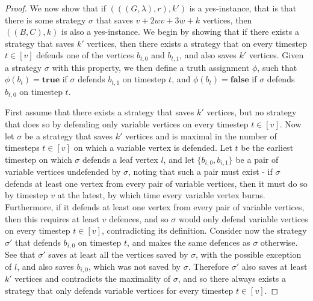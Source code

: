 \documentclass[a4paper,UKenglish,cleveref, autoref, thm-restate]{lipics-v2021} %
\begin{document}
\begin{toappendix}
\begin{proof}
We now show that if $(((G, \lambda), r), k')$ is a yes-instance, that is that there is some strategy $\sigma$ that saves $v+2wv+3w+k$ vertices, then $((B, C), k)$ is also a yes-instance. We begin by showing that if there exists a strategy that saves $k'$ vertices, then there exists a strategy that on every timestep $t \in [v]$ defends one of the vertices $b_{t,0}$ and $b_{t,1}$, and also saves $k'$ vertices. Given a strategy $\sigma$ with this property, we then define a truth assignment $\phi$, such that $\phi(b_t)=\textbf{true}$ if $\sigma$ defends $b_{t,1}$ on timestep $t$, and $\phi(b_t)=\textbf{false}$ if $\sigma$ defends $b_{t,0}$ on timestep $t$.

First assume that there exists a strategy that saves $k'$ vertices, but no strategy that does so by defending only variable vertices on every timestep $t \in [v]$. Now let $\sigma$ be a strategy that saves $k'$ vertices and is maximal in the number of timesteps $t \in [v]$ on which a variable vertex is defended. Let $t$ be the earliest timestep on which $\sigma$ defends a leaf vertex $l$, and let $\{b_{i,0}, b_{i,1}\}$ be a pair of variable vertices undefended by $\sigma$, noting that such a pair must exist - if $\sigma$ defends at least one vertex from every pair of variable vertices, then it must do so by timestep $v$ at the latest, by which time every variable vertex burns. Furthermore, if it defends at least one vertex from every pair of variable vertices, then this requires at least $v$ defences, and so $\sigma$ would only defend variable vertices on every timestep $t \in [v]$, contradicting its definition. Consider now the strategy $\sigma'$ that defends $b_{i,0}$ on timestep $t$, and makes the same defences as $\sigma$ otherwise. See that $\sigma'$ saves at least all the vertices saved by $\sigma$, with the possible exception of $l$, and also saves $b_{i,0}$, which was not saved by $\sigma$. Therefore $\sigma'$ also saves at least $k'$ vertices and contradicts the maximality of $\sigma$, and so there always exists a strategy that only defends variable vertices for every timestep $t \in [v]$.


\end{proof}
\end{toappendix}
\end{document}
